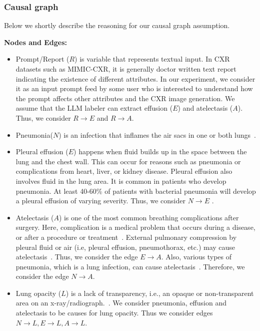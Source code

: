 \documentclass{article}
\theoremstyle{plain}
\theoremstyle{definition}
\theoremstyle{remark}
\begin{document}
\subsubsection{Causal graph}
Below we shortly describe the reasoning for our causal graph assumption.

\textbf{Nodes and Edges:}
\begin{itemize}

\item Prompt/Report ($R$) is variable that represents textual input. In CXR datasets such as MIMIC-CXR, it is generally doctor written text report indicating the existence of different attributes. In our experiment, we consider it as an input prompt feed by some user who is interested to  understand how the prompt affects other attributes and the CXR image generation. We assume that the LLM labeler can extract effusion ($E$) and atelectasis ($A$). Thus, we consider $R\rightarrow E$ and $R\rightarrow A$.

    \item Pneumonia($N$) is an infection that inflames the air sacs in one or both lungs~\citep{mayoclinic}.
\item Pleural effusion ($E$) happens when fluid builds up in the space between the lung and the chest wall. This can occur for reasons such as pneumonia or complications from heart, liver, or kidney disease.
  Pleural effusion also involves fluid in the lung area.
  It is common in patients who develop pneumonia. At least 40-60\% of patients with bacterial pneumonia will develop a pleural effusion of varying severity. Thus, we consider $N\rightarrow E$ .
    
    \item Atelectasis ($A$) is one of the most common breathing complications after surgery. Here, complication is a medical problem that occurs during a disease, or after a procedure or treatment~\citep{clevelandclinic}. 
External pulmonary compression by pleural fluid or air (i.e, pleural effusion, pneumothorax, etc.) may cause atelectasis~\citep{medscape}.
Thus, we consider the edge $E \rightarrow A$.
Also, various types of pneumonia, which is a lung infection, can cause atelectasis~\citep{mayoclinic_atelectasis}. Therefore, we consider the edge $N\rightarrow A$.

\item Lung opacity ($L$) is a lack of transparency, i.e., an opaque or non-transparent area on an x-ray/radiograph.~\citep{healthline_lung_opacity}.
We consider pneumonia, effusion and atelectasis to be causes for lung opacity. Thus we consider edges $N\rightarrow L, E\rightarrow L, A\rightarrow L$.



\end{itemize}
\end{document}

